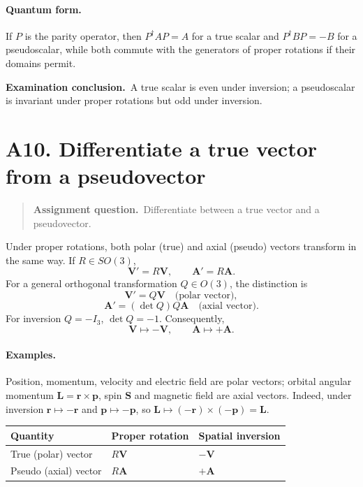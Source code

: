\documentclass[11pt,a4paper]{article}
\theoremstyle{definition}
\newenvironment{question}{\begin{quote}\small\noindent\textbf{Assignment question.}\ }{\end{quote}}
\newcommand{\exam}[1]{\par\medskip\noindent\textbf{Examination conclusion.}\ #1\par}
\begin{document}
\paragraph{Quantum form.} If $P$ is the parity operator, then $P^\dagger A P=A$ for a true scalar and $P^\dagger B P=-B$ for a pseudoscalar, while both commute with the generators of proper rotations if their domains permit.
\exam{A true scalar is even under inversion; a pseudoscalar is invariant under proper rotations but odd under inversion.}

\section{A10. Differentiate a true vector from a pseudovector}
\begin{question}Differentiate between a true vector and a pseudovector.\end{question}
Under proper rotations, both polar (true) and axial (pseudo) vectors transform in the same way. If $R\in SO(3)$,
\begin{equation}
\mathbf V'=R\mathbf V,\qquad\mathbf A'=R\mathbf A.
\end{equation}
For a general orthogonal transformation $Q\in O(3)$, the distinction is
\begin{equation}
\boxed{\mathbf V'=Q\mathbf V}\quad\text{(polar vector)},
\end{equation}
\begin{equation}
\boxed{\mathbf A'=(\det Q)Q\mathbf A}\quad\text{(axial vector)}.
\end{equation}
For inversion $Q=-I_3$, $\det Q=-1$. Consequently,
\begin{equation}
\boxed{\mathbf V\mapsto-\mathbf V,\qquad\mathbf A\mapsto+\mathbf A.}
\end{equation}
\paragraph{Examples.} Position, momentum, velocity and electric field are polar vectors; orbital angular momentum $\mathbf L=\mathbf r\times\mathbf p$, spin $\mathbf S$ and magnetic field are axial vectors. Indeed, under inversion $\mathbf r\mapsto-\mathbf r$ and $\mathbf p\mapsto-\mathbf p$, so $\mathbf L\mapsto(-\mathbf r)\times(-\mathbf p)=\mathbf L$.
\begin{center}\small\begin{tabular}{@{}lll@{}}\toprule
Quantity & Proper rotation & Spatial inversion\\\midrule
True (polar) vector & $R\mathbf V$ & $-\mathbf V$\\
Pseudo (axial) vector & $R\mathbf A$ & $+\mathbf A$\\\bottomrule
\end{tabular}\end{center}
\end{document}
